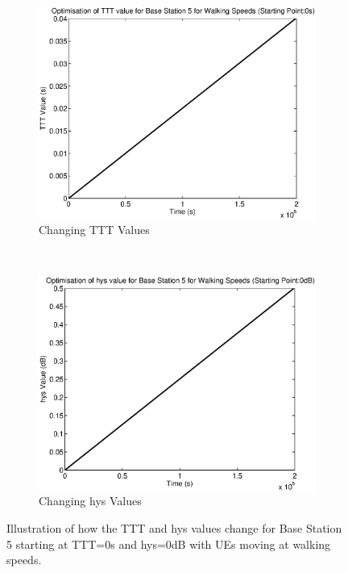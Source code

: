 \begin{figure}[H]
        \centering
        \begin{subfigure}[b]{0.49\textwidth}
                \includegraphics[width=\textwidth]{figures/graphs/walklow/TTT5.eps}
                \caption{Changing TTT Values}
        \end{subfigure}%
        ~ %
        \begin{subfigure}[b]{0.49\textwidth}
                \includegraphics[width=\textwidth]{figures/graphs/walklow/hys5.eps}
                \caption{Changing hys Values}
        \end{subfigure}
        \caption{Illustration of how the TTT and hys values change for Base Station 5 starting at TTT=0s and hys=0dB with UEs moving at walking speeds.}
\end{figure}
